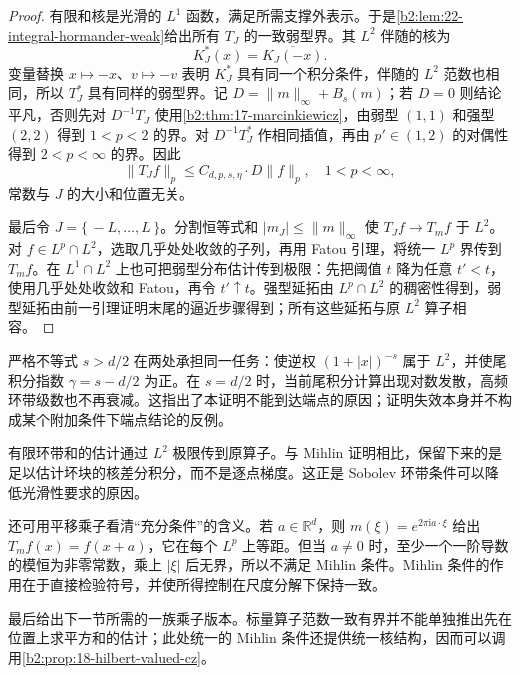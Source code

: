 \begin{proof}
有限和核是光滑的 \(L^1\) 函数，满足所需支撑外表示。于是\cref{b2:lem:22-integral-hormander-weak}给出所有 \(T_J\) 的一致弱型界。其 \(L^2\) 伴随的核为
\[
 K_J^*(x)=\overline{K_J(-x)}.
\]
变量替换 \(x\mapsto-x\)、\(v\mapsto-v\) 表明 \(K_J^*\) 具有同一个积分条件，伴随的 \(L^2\) 范数也相同，所以 \(T_J^*\) 具有同样的弱型界。记 \(D=\|m\|_\infty+B_s(m)\)；若 \(D=0\) 则结论平凡，否则先对 \(D^{-1}T_J\) 使用\cref{b2:thm:17-marcinkiewicz}，由弱型 \((1,1)\) 和强型 \((2,2)\) 得到 \(1<p<2\) 的界。对 \(D^{-1}T_J^*\) 作相同插值，再由 \(p'\in(1,2)\) 的对偶性得到 \(2<p<\infty\) 的界。因此
\[
 \|T_Jf\|_p\leq C_{d,p,s,\eta}\cdot D\|f\|_p,
 \quad1<p<\infty,
\]
常数与 \(J\) 的大小和位置无关。

最后令 \(J=\{\,-L,\ldots,L\,\}\)。分割恒等式和 \(|m_J|\leq\|m\|_\infty\) 使 \(T_Jf\to T_mf\) 于 \(L^2\)。对 \(f\in L^p\cap L^2\)，选取几乎处处收敛的子列，再用 Fatou 引理，将统一 \(L^p\) 界传到 \(T_mf\)。在 \(L^1\cap L^2\) 上也可把弱型分布估计传到极限：先把阈值 \(t\) 降为任意 \(t'<t\)，使用几乎处处收敛和 Fatou，再令 \(t'\uparrow t\)。强型延拓由 \(L^p\cap L^2\) 的稠密性得到，弱型延拓由前一引理证明末尾的逼近步骤得到；所有这些延拓与原 \(L^2\) 算子相容。
\end{proof}

严格不等式 \(s>d/2\) 在两处承担同一任务：使逆权 \((1+|x|)^{-s}\) 属于 \(L^2\)，并使尾积分指数 \(\gamma=s-d/2\) 为正。在 \(s=d/2\) 时，当前尾积分计算出现对数发散，高频环带级数也不再衰减。这指出了本证明不能到达端点的原因；证明失效本身并不构成某个附加条件下端点结论的反例。

\ProseParagraphBreak
有限环带和的估计通过 \(L^2\) 极限传到原算子。与 Mihlin 证明相比，保留下来的是足以估计坏块的核差分积分，而不是逐点梯度。这正是 Sobolev 环带条件可以降低光滑性要求的原因。

\ProseParagraphBreak
还可用平移乘子看清“充分条件”的含义。若 \(a\in\mathbb R^d\)，则 \(m(\xi)=e^{2\pi\mathrm i a\cdot\xi}\) 给出 \(T_mf(x)=f(x+a)\)，它在每个 \(L^p\) 上等距。但当 \(a\ne0\) 时，至少一个一阶导数的模恒为非零常数，乘上 \(|\xi|\) 后无界，所以不满足 Mihlin 条件。Mihlin 条件的作用在于直接检验符号，并使所得控制在尺度分解下保持一致。

\ProseParagraphBreak
最后给出下一节所需的一族乘子版本。标量算子范数一致有界并不能单独推出先在位置上求平方和的估计；此处统一的 Mihlin 条件还提供统一核结构，因而可以调用\cref{b2:prop:18-hilbert-valued-cz}。


